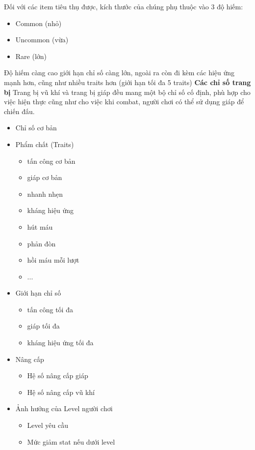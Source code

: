 Đối với các item tiêu thụ được, kích thước của chúng phụ thuộc vào 3 độ hiếm: 
\begin{itemize}
	\item Common (nhỏ)
	\item Uncommon (vừa)
	\item Rare (lớn)
\end{itemize}
Độ hiếm càng cao giới hạn chỉ số càng lớn, ngoài ra còn đi kèm các hiệu ứng mạnh hơn, cũng như nhiều traits hơn (giới hạn tối đa 5 traits)
\textbf{Các chỉ số trang bị}
Trang bị vũ khí và trang bị giáp đều mang một bộ chỉ số cố định, phù hợp cho việc hiện thực cũng như cho việc khi combat, người chơi có thể sử dụng giáp để chiến đấu.
\begin{itemize}
	\item Chỉ số cơ bản
	\item Phẩm chất (Traits)
	\begin{itemize}
		\item tấn công cơ bản
		\item giáp cơ bản
		\item nhanh nhẹn
		\item kháng hiệu ứng
		\item hút máu
		\item phản đòn
		\item hồi máu mỗi lượt
		\item ...
	\end{itemize}
	\item Giới hạn chỉ số
	\begin{itemize}
		\item tấn công tối đa
		\item giáp tối đa
		\item kháng hiệu ứng tối đa
	\end{itemize}
	\item Nâng cấp
	\begin{itemize}
		\item Hệ số nâng cấp giáp
		\item Hệ số nâng cấp vũ khí
	\end{itemize}
	\item Ảnh hưởng của Level người chơi
	\begin{itemize}
		\item Level yêu cầu
		\item Mức giảm stat nếu dưới level
	\end{itemize}
\end{itemize}

